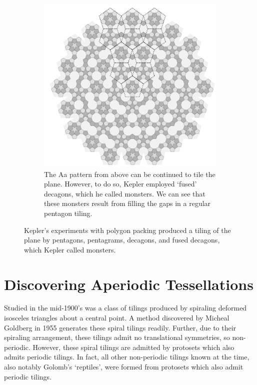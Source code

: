 \documentclass[
  oneside,
  11pt, a4paper,
  footinclude=true,
  headinclude=true,
  cleardoublepage=empty
]{scrbook}
\begin{document}
\begin{figure}[H]
        ~ %
        \begin{subfigure}[b]{0.9\textwidth}
                \includegraphics[width=\textwidth]{Monsters}
                \caption{The Aa pattern from above can be continued to tile the plane. However, to do so, Kepler employed `fused' decagons, which he called monsters. We can see that these monsters result from filling the gaps in a regular pentagon tiling. \cite{CraigKaplan}}
                \label{fig:tilingmonsters}
        \end{subfigure}\hfill
         \caption[Kepler's Experiments with Monsters]{Kepler's experiments with polygon packing produced a tiling of the plane by pentagons, pentagrams, decagons, and fused decagons, which Kepler called monsters.}
         \label{fig:Monsters}
\end{figure}

\section{Discovering Aperiodic Tessellations} %
Studied in the mid-1900's was a class of tilings produced by spiraling deformed isosceles triangles about a central point. A method discovered by Micheal Goldberg in 1955 generates these spiral tilings readily. Further, due to their spiraling arrangement, these tilings admit no translational symmetries, so non-periodic. However, these spiral tilings are admitted by protosets which also admits periodic tilings. In fact, all other non-periodic tilings known at the time, also notably Golomb's `reptiles', were formed from protosets which also admit periodic tilings.
\end{document}
